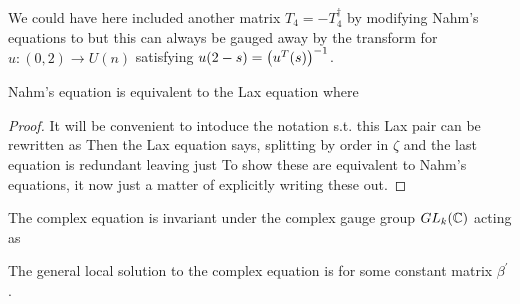\documentclass{article}
\begin{document}
\begin{remark}
	We could have here included another matrix $T_4 = -T_4^\dagger$ by modifying Nahm's equations to 
but this can always be gauged away by the transform 
for $u:(0,2) \to U(n)$ satisfying $u(2-s) = \left( u^T(s) \right)^{-1}$.
\end{remark}

\begin{prop}
	Nahm's equation is equivalent to the Lax equation 
where 
\end{prop}
\begin{proof}
	It will be convenient to intoduce the notation 
	s.t. this Lax pair can be rewritten as 
Then the Lax equation says, splitting by order in $\zeta$
and the last equation is redundant leaving just
To show these are equivalent to Nahm's equations, it now just a matter of explicitly writing these out. 
\end{proof}

\begin{lemma}
	The complex equation is invariant under the complex gauge group $GL_k(\mathbb{C})$ acting as 
\end{lemma}

\begin{prop}
	The general local solution to the complex equation is 
for some constant matrix $\beta^\prime$. 
\end{prop}
\end{document}
